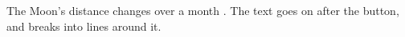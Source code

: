 The Moon's distance changes over a month . The text goes on after
the button, and breaks into lines around it.
